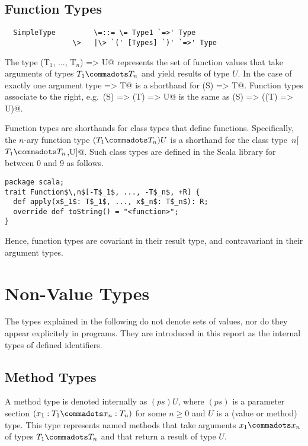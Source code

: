 \documentclass[11pt]{report}
\begin{document}
\subsection{Function Types}
\label{sec:function-types}

\syntax\begin{verbatim}
  SimpleType         \=::= \= Type1 `=>' Type
                \>   |\> `(' [Types] `)' `=>' Type
\end{verbatim}
The type \verb@(T$_1$, ..., T$_n$) => U@ represents the set of function
values that take arguments of types $T_1 \commadots T_n$ and yield
results of type $U$.  In the case of exactly one argument type
\verb@S => T@ is a shorthand for \verb@(S) => T@.  Function types
associate to the right, e.g.\ \verb@(S) => (T) => U@ is the same as
\verb@(S) => ((T) => U)@.

Function types are shorthands for class types that define \verb@apply@
functions.  Specifically, the $n$-ary function type $(T_1 \commadots
T_n)U$ is a shorthand for the class type
\verb@Function$\,n$[$T_1 \commadots T_n$,U]@. Such class
types are defined in the Scala library for \verb@n@ between 0 and 9 as follows.
\begin{verbatim}
package scala;
trait Function$\,n$[-T$_1$, ..., -T$_n$, +R] {
  def apply(x$_1$: T$_1$, ..., x$_n$: T$_n$): R;
  override def toString() = "<function>";
}
\end{verbatim}
Hence, function types are covariant in their result type, and
contravariant in their argument types.

\section{Non-Value Types}
\label{sec:synthetic-types}

The types explained in the following do not denote sets of values, nor
do they appear explicitely in programs. They are introduced in this
report as the internal types of defined identifiers.

\subsection{Method Types}
\label{sec:method-types}

A method type is denoted internally as $(ps)U$, where $(ps)$ is a
parameter section $(x_1: T_1 \commadots x_n: T_n)$ for some $n \geq 0$
and $U$ is a (value or method) type.  This type represents named
methods that take arguments $x_1 \commadots x_n$ of types $T_1
\commadots T_n$ and that return a result of type $U$.
\end{document}
